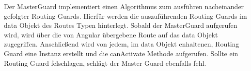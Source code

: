 \begin{description}
	Der MasterGuard implementiert einen Algorithmus zum ausführen nacheinander gefolgter Routing Guards. Hierfür werden die auszuführenden Routing Guards im data Objekt des Routes Typen hinterlegt. Sobald der MasterGuard aufgerufen wird, wird über die von Angular übergebene Route auf das data Objekt zugegriffen. Anschließend wird von jedem, im data Objekt enhaltenen, Routing Guard eine Instanz erstellt und die canActivate Methode aufgerufen. Sollte ein Routing Guard felschlagen, schlägt der Master Guard ebenfalls fehl.

\end{description}

